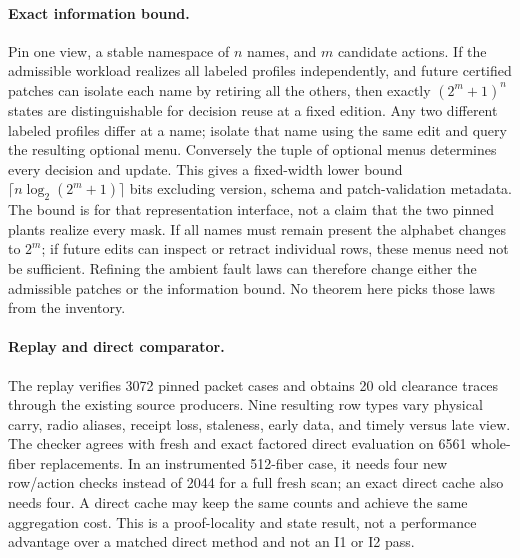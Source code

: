 \documentclass{article}
\begin{document}
\paragraph{Exact information bound.}
Pin one view, a stable namespace of $n$ names, and $m$ candidate actions.
If the admissible workload realizes all labeled profiles independently,
and future certified patches can isolate each name by retiring all the others,
then exactly $(2^m+1)^n$ states are distinguishable for decision reuse
at a fixed edition. Any two different labeled profiles differ at a name;
isolate that name using the same edit and query the resulting optional menu.
Conversely the tuple of optional menus determines every decision and update.
This gives a fixed-width lower bound $\lceil n\log_2(2^m+1)\rceil$ bits excluding
version, schema and patch-validation metadata. The bound is for that representation
interface, not a claim that the two pinned plants realize every mask.
If all names must remain present the alphabet changes to $2^m$; if future edits
can inspect or retract individual rows, these menus need not be sufficient.
Refining the ambient fault laws can therefore change either the admissible
patches or the information bound. No theorem here picks those laws from the inventory.

\paragraph{Replay and direct comparator.}
The replay verifies 3072 pinned packet cases and obtains 20 old clearance
traces through the existing source producers.
Nine resulting row types vary physical carry, radio aliases, receipt loss,
staleness, early data, and timely versus late view. The checker agrees with
fresh and exact factored direct evaluation on 6561 whole-fiber replacements.
In an instrumented 512-fiber case, it needs four new row/action checks instead
of 2044 for a full fresh scan; an exact direct cache also needs four.
A direct cache may keep the same counts and achieve the same aggregation cost.
This is a proof-locality and state result, not a performance advantage over a
matched direct method and not an I1 or I2 pass.
\end{document}
